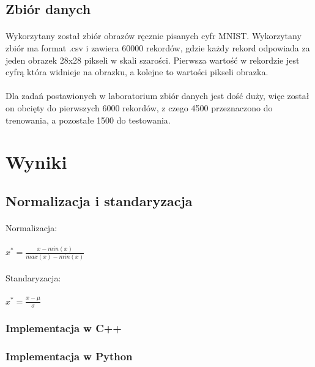 \documentclass[a4paper,11pt]{article}
\begin{document}
\subsection{Zbiór danych} 
\paragraph{}Wykorzytany został zbiór obrazów ręcznie pisanych cyfr MNIST. Wykorzytany zbiór ma format .csv i zawiera 60000 rekordów, gdzie każdy rekord odpowiada za jeden obrazek 28x28 pikseli w skali szarości. Pierwsza wartość w rekordzie jest cyfrą która widnieje na obrazku, a kolejne to wartości pikseli obrazka. 
\paragraph{}
Dla zadań postawionych w laboratorium zbiór danych jest dość duży, więc został on obcięty do pierwszych 6000 rekordów, z czego 4500 przeznaczono do trenowania, a pozostałe 1500 do testowania.
\newpage    
\section{Wyniki}   
\subsection{Normalizacja i standaryzacja} 
\paragraph{}Normalizacja:
\paragraph{}$x^*=\frac{x-min(x)}{max(x)-min(x)}$
\paragraph{} Standaryzacja:
\paragraph{}$x^*=\frac{x-\mu}{\sigma}$
\subsubsection{Implementacja w C++} 
\subsubsection{Implementacja w Python} 
\end{document}
